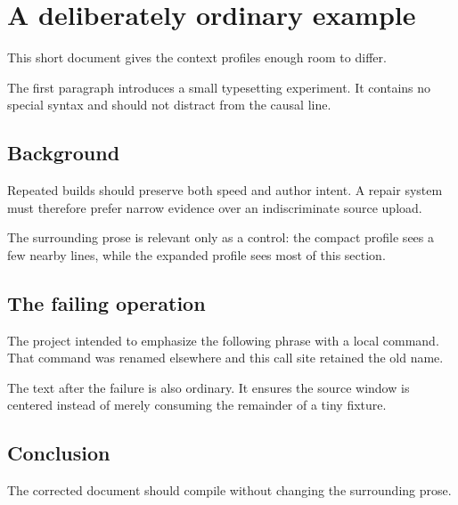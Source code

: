 \documentclass{article}
\begin{document}
\section{A deliberately ordinary example}
This short document gives the context profiles enough room to differ.

The first paragraph introduces a small typesetting experiment. It contains no
special syntax and should not distract from the causal line.

\subsection{Background}
Repeated builds should preserve both speed and author intent. A repair system
must therefore prefer narrow evidence over an indiscriminate source upload.

The surrounding prose is relevant only as a control: the compact profile sees
a few nearby lines, while the expanded profile sees most of this section.

\subsection{The failing operation}
The project intended to emphasize the following phrase with a local command.
That command was renamed elsewhere and this call site retained the old name.

The text after the failure is also ordinary. It ensures the source window is
centered instead of merely consuming the remainder of a tiny fixture.

\subsection{Conclusion}
The corrected document should compile without changing the surrounding prose.
\end{document}
